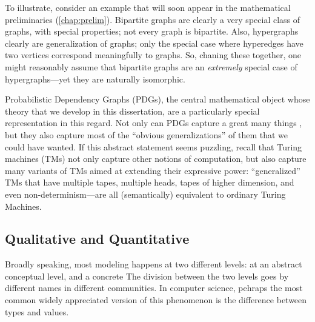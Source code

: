 To illustrate, consider an example that will soon appear in the mathematical preliminaries (\cref{chap:prelim}). 
Bipartite graphs are clearly a very special class of graphs, with special properties; not every graph is bipartite. 
Also, hypergraphs clearly are generalization of graphs; only the special case where hyperedges have two vertices correspond meaningfully to graphs. 
So, chaning these together, one might reasonably assume that bipartite graphs are an \emph{extremely} special case of hypergraphs---yet they are naturally isomorphic. 


Probabilistic Dependency Graphs (PDGs), the central mathematical object whose theory that we develop in this dissertation, are a particularly special representation in this regard. 
Not only can PDGs capture a great many things 
\unskip, but they also capture most of the ``obvious generalizations'' of them that we could have wanted. 
If this abstract statement seems puzzling, recall that Turing machines (TMs) not only capture other notions of computation, but also capture many variants of TMs aimed at extending their expressive power: ``generalized'' TMs that have multiple tapes, multiple heads, tapes of higher dimension, and even non-determinism---are all (semantically) equivalent to ordinary Turing Machines. 



\subsection{Qualitative and Quantitative}

Broadly speaking, most modeling happens at two different levels: 
    at an abstract conceptual level, and a concrete 
The division between the two levels goes by different names in different communities. 
In computer science, pehraps the most common
    widely appreciated version of this phenomenon is 
    the difference between types and values.
    
